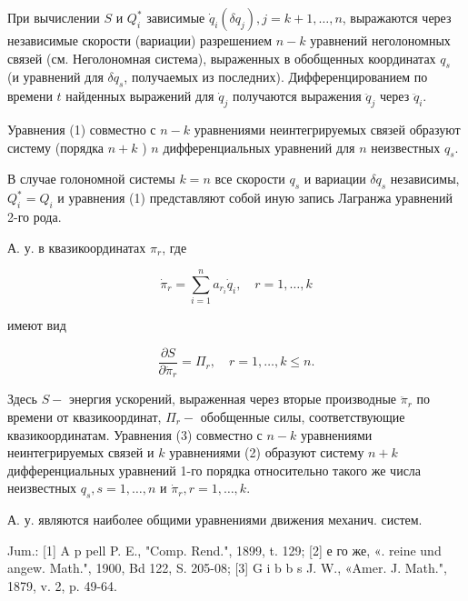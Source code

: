 \documentclass[10pt]{article}
\begin{document}
При вычислении $S$ и $Q_{i}^{*}$ зависимые $\dot{q}_{i}\left(\delta q_{j}\right), j=k+1, \ldots, n$, выражаются через независимые скорости (вариации) разрешением $n-k$ уравнений неголономных связей (см. Неголономная система), выраженных в обобщенных координатах $q_{s}$ (и уравнений для $\delta q_{s}$, получаемых из последних). Дифференцированием по времени $t$ найденных выражений для $\dot{q}_{j}$ получаются выражения $\ddot{q}_{j}$ через $\ddot{q}_{i}$.



Уравнения (1) совместно с $n-k$ уравнениями неинтегрируемых связей образуют систему (порядка $n+k$ ) $n$ дифференциальных уравнений для $n$ неизвестных $q_{s}$.



В случае голономной системы $k=n$ все скорости $q_{s}$ и вариации $\delta q_{s}$ независимы, $Q_{i}^{*}=Q_{i}$ и уравнения (1) представляют собой иную запись Лагранжа уравнений 2-го рода.



А. у. в квазикоординатах $\pi_{r}$, где



\[

\dot{\pi}_{r}=\sum_{i=1}^{n} a_{r_{i}} \dot{q}_{i}, \quad r=1, \ldots, k

\]



имеют вид



\[

\frac{\partial S}{\partial \ddot{\pi}_{r}}=\Pi_{r}, \quad r=1, \ldots, k \leqslant n .

\]



Здесь $S-$ энергия ускорений, выраженная через вторые производные $\ddot{\pi}_{r}$ по времени от квазикоординат, $\Pi_{r}-$ обобщенные силы, соответствующие квазикоординатам. Уравнения (3) совместно с $n-k$ уравнениями неинтегрируемых связей и $k$ уравнениями (2) образуют систему $n+k$ дифференциальных уравнений 1-го порядка относительно такого же числа неизвестных $q_{s}, s=1, \ldots, n$ и $\dot{\pi}_{r}, r=1, \ldots, k$.



А. у. являются наиболее общими уравнениями движения механич. систем.



Jum.: [1] A p pell P. E., "Comp. Rend.", 1899, t. 129; [2] е го же, «. reine und angew. Math.", 1900, Bd 122, S. 205-08; [3] G i b b s J. W., «Amer. J. Math.", 1879, v. 2, p. 49-64.
\end{document}
